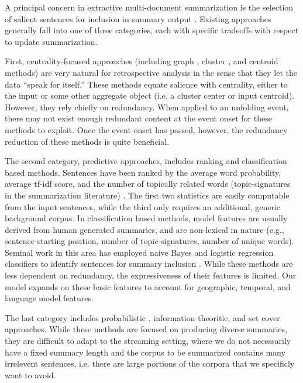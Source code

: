 \label{sec:relatedwork}

A principal concern in extractive multi-document summarization is the
selection of salient sentences for inclusion in summary output
\cite{nenkova2012survey}. 
Existing approaches generally fall into  %
one of three categories, each with specific tradeoffs with respect to update 
summarization. 

First, centrality-focused approaches (including graph \cite{erkan2004lexrank},
cluster \cite{hatzivassiloglou2001simfinder}, and centroid \cite{radev2004centroid} methods) are very natural for retrospective analysis in
the sense that they let the data ``speak for itself.'' 
These methods equate salience with centrality, either to the input or some other
aggregate object (i.e. a cluster center or input centroid).
However, they rely
chiefly on
redundancy. When applied to an unfolding event, there may not exist enough
redundant content at the event onset for these methods to exploit.
Once the event onset has passed, however, the redundancy reduction of these 
methods is quite beneficial.

The second category, predictive approaches,
includes ranking and classification based methods.
Sentences have been ranked by the average word probability, average tf-idf
score, and the number of topically related words (topic-signatures in the
summarization literature)
\cite{nenkova2005impact,hovy1998automated,lin2000automated}. The first two
statistics are easily computable from the input sentences, while the third
only requires an additional, generic background corpus.  
In classification based methods, model features are
usually derived from human generated summaries, and are non-lexical in nature
(e.g., sentence starting position, number of topic-signatures, number of
unique words). Seminal work in this area has employed naive
Bayes and logistic regression classifiers to identify sentences for summary
inclusion \cite{kupiec1995trainable,conroy2001using}. 
While these methods are less dependent on redundancy, the expressiveness of
their features is limited. Our model expands on these basic features to 
account for geographic, temporal, and language model features.

The last category includes probabilistic \cite{haghighi2009exploring}, 
information theoritic, and set cover \cite{lin2011class}
approaches. While these methods are  focused on producing diverse
summaries, they are difficult to adapt to the streaming setting, where 
we do not necessarily have a fixed summary length and the corpus to be
summarized contains many irrelevent sentences, i.e. there are large
portions of the corpora that we specificly want to avoid. 




